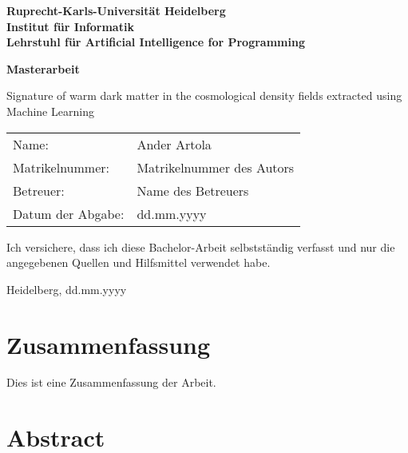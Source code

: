 \documentclass[
     12pt,                    %
     a4paper,             %
     BCOR=10mm,     %
     DIV=14,                 %
     listof=totoc,                    %
     bibliography=totoc,       %
     index=totoc,              %
     twoside,
     headsepline
     ]{scrreprt}
\begin{document}
\begin{titlepage}


\vspace*{1cm}
\begin{center}
\vspace*{3cm}
\textbf{ 
\Large Ruprecht-Karls-Universität Heidelberg\\
\smallskip
\Large Institut für Informatik\\
\smallskip
\Large Lehrstuhl für Artificial Intelligence for Programming\\
\smallskip
}

\vspace{3cm}

\textbf{\large Masterarbeit} %

\vspace{0.5\baselineskip}
{\huge
Signature of warm dark matter in the
cosmological density fields extracted using
Machine Learning
}
\end{center}

\vfill 

{\large
\begin{tabular}[l]{ll}
Name: & Ander Artola\\
Matrikelnummer: & Matrikelnummer des Autors\\
Betreuer: & Name des Betreuers\\
Datum der Abgabe: & dd.mm.yyyy
\end{tabular}
}

\end{titlepage}

\onehalfspacing

\thispagestyle{empty}

\vspace*{100pt}
\noindent
Ich versichere, dass ich diese Bachelor-Arbeit selbstständig verfasst und nur die angegebenen
Quellen und Hilfsmittel verwendet habe.

\vspace*{50pt}

\noindent
Heidelberg, dd.mm.yyyy
\cleardoublepage

\section*{Zusammenfassung}

Dies ist eine Zusammenfassung der Arbeit.

\section*{Abstract}
\end{document}
